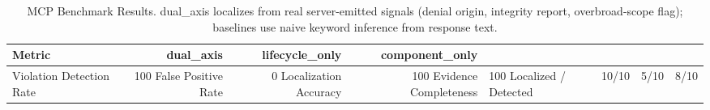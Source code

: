 \begin{table}[h]
\centering
\begin{tabular}{lrrr}
\hline
Metric & dual\_axis & lifecycle\_only & component\_only \\
\hline
Violation Detection Rate & 100%
False Positive Rate & 0%
Localization Accuracy & 100%
Evidence Completeness & 100%
Localized / Detected & 10/10 & 5/10 & 8/10 \\
\hline
\end{tabular}
\caption{MCP Benchmark Results. dual\_axis localizes from real server-emitted signals (denial origin, integrity report, overbroad-scope flag); baselines use naive keyword inference from response text.}
\label{tab:benchmark}
\end{table}